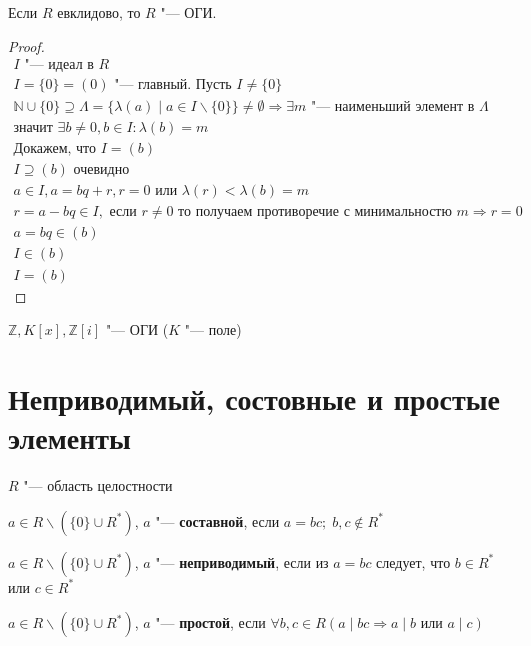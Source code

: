 \begin{theorem}
	Если $R$ евклидово, то $R$ "--- ОГИ.
\end{theorem}

\begin{proof}
	\begin{gather*}
		I \text{ "--- идеал в } R\\
		I = \{0\} = \left(0\right) \text{ "--- главный. Пусть } I \neq \{0\}\\
		\mathbb{N} \cup \{0\} \supseteq \Lambda = \{\lambda\left(a\right) \mid a \in I \smallsetminus \{0\} \} \neq \emptyset \Rightarrow 
		\exists m \text{ "--- наименьший элемент в } \Lambda \\
		\text{значит } \exists b \neq 0, b \in I \colon \lambda\left(b\right) = m\\
		\text{Докажем, что } I = \left(b\right) \\
		I \supseteq \left(b\right) \text{ очевидно} \\
		a \in I, a = bq + r, r = 0 \text{ или } \lambda\left(r\right) < \lambda\left(b\right) = m\\
		r = a - bq \in I, \text{ если } r \neq 0 \text{ то получаем противоречие с минимальностю } m \Rightarrow r = 0\\
		a = bq \in\left(b\right) \\
		I \in \left(b\right) \\
		I = \left(b\right)
	\end{gather*}
\end{proof}

\begin{conseq}
	$\mathbb{Z}, K\left[x\right], \mathbb{Z}\left[i\right] $ "--- ОГИ ($K$ "--- поле)
\end{conseq}

\section{Неприводимый, состовные и простые элементы}
$R$ "--- область целостности 
\begin{Def}
	$a \in R \smallsetminus \left(\{0\} \cup R^{*}\right)$, $a$ "--- \textbf{составной}, если $a = bc; \; b, c \notin R^{*}$
\end{Def}

\begin{Def}
	$a \in R \smallsetminus \left(\{0\} \cup R^{*}\right)$, $a$ "--- \textbf{неприводимый}, если из $a = bc$ следует, что 
	$b \in R^{*}$ или $c \in R^{*}$
\end{Def}

\begin{Def}
	$a \in R \smallsetminus \left(\{0\} \cup R^{*}\right)$, $a$ "--- \textbf{простой}, если $\forall b, c \in R 
	\left(a \mid bc \Rightarrow a \mid b \text{ или } a \mid c \right)$ 
\end{Def}


